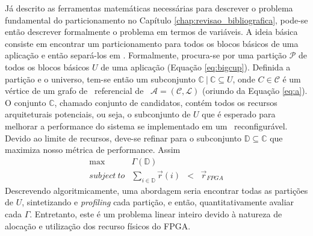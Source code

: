          Já descrito as ferramentas matemáticas necessárias para descrever o problema fundamental do particionamento no Capítulo \ref{chap:revisao_bibliografica}, pode-se então descrever formalmente o problema em termos de variáveis. %
         A ideia básica consiste em encontrar um particionamento para todos os blocos básicos de uma aplicação e então separá-los em \hs.
         Formalmente, procura-se por uma partição $ \mathcal{P} $ de todos os blocos básicos $ U $ de uma aplicação (Equação \ref{eq:bigcup}).
         Definida a partição e o universo, tem-se então um subconjunto $ \mathbb{C}\ |\ \mathbb{C} \subseteq U $, onde $ C \in \mathcal{C} $ é um vértice de um grafo de \design\ referencial de \software\ $ \mathcal{A} = (\mathcal{C}, \mathcal{L}) $ (oriundo da Equação \ref{eq:a}).
         O conjunto $ \mathbb{C} $, chamado conjunto de candidatos, contém todos os recursos arquiteturais potenciais, ou seja, o subconjunto de $ U $ que é esperado para melhorar a performance do sistema se implementado em um \hardware\ reconfigurável.
         Devido ao limite de recursos, deve-se refinar para o subconjunto $ \mathbb{D} \subseteq \mathbb{C} $ que maximiza nosso métrica de performance.
         Assim
         \begin{equation}
            \begin{array}{rrcl}
            \text{max}                 & \Gamma ( \mathbb{D})               & ~   & ~                \\
            subject\ to & \sum_{i \in \mathbb{D}} \vec{r}(i) & < & \vec{r}_{FPGA}
            \end{array}
            \label{eq:constraints}
         \end{equation}
         Descrevendo algoritmicamente, uma abordagem seria encontrar todas as partições de $ U $, sintetizando e \textit{profiling} cada partição, e então, quantitativamente avaliar cada $ \Gamma $.
         Entretanto, este é um problema linear inteiro devido à natureza de alocação e utilização dos recurso físicos do FPGA. %

